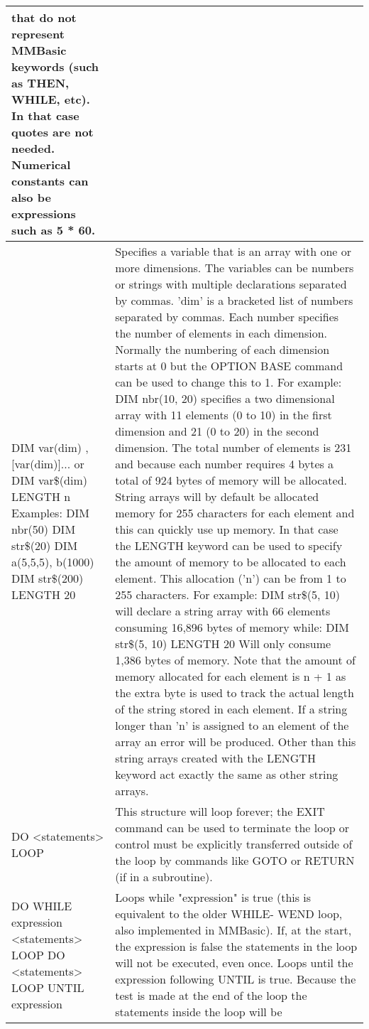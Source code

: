 \documentclass[11pt,fleqn]{book} %
\numberwithin{equation}{section} %
\numberwithin{figure}{section} %
\numberwithin{table}{section} %
\begin{document}
\begin{table}[]
\begin{tabular}{|p{4cm}|p{10cm}|}
that do not represent MMBasic keywords (such as THEN, WHILE, etc).
In that case quotes are not needed.
Numerical constants can also be expressions such as 5 * 60.
\\ \hline
DIM var(dim) , [var(dim)]...
or
DIM var\$(dim) LENGTH n
Examples:
DIM nbr(50)
DIM str\$(20)
DIM a(5,5,5), b(1000)
DIM str\$(200) LENGTH 20
&
Specifies a variable that is an array with one or more dimensions. The
variables can be numbers or strings with multiple declarations separated
by commas.
'dim' is a bracketed list of numbers separated by commas. Each number
specifies the number of elements in each dimension. Normally the
numbering of each dimension starts at 0 but the OPTION BASE
command can be used to change this to 1.
For example: DIM nbr(10, 20) specifies a two dimensional array with
11 elements (0 to 10) in the first dimension and 21 (0 to 20) in the
second dimension. The total number of elements is 231 and because
each number requires 4 bytes a total of 924 bytes of memory will be
allocated.
String arrays will by default be allocated memory for 255 characters for
each element and this can quickly use up memory. In that case the
LENGTH keyword can be used to specify the amount of memory to be
allocated to each element. This allocation ('n') can be from 1 to 255
characters.
For example: DIM str\$(5, 10) will declare a string array with 66
elements consuming 16,896 bytes of memory while:
DIM str\$(5, 10) LENGTH 20
Will only consume 1,386 bytes of memory. Note that the amount of
memory allocated for each element is n + 1 as the extra byte is used to
track the actual length of the string stored in each element.
If a string longer than 'n' is assigned to an element of the array an error
will be produced. Other than this string arrays created with the
LENGTH keyword act exactly the same as other string arrays.
\\ \hline
DO
<statements>
LOOP
& This structure will loop forever; the EXIT command can be used to
terminate the loop or control must be explicitly transferred outside of the
loop by commands like GOTO or RETURN (if in a subroutine).
\\ \hline
DO WHILE expression
<statements>
LOOP
DO
<statements>
LOOP UNTIL expression
& 
Loops while "expression" is true (this is equivalent to the older WHILE-
WEND loop, also implemented in MMBasic). If, at the start, the
expression is false the statements in the loop will not be executed, even
once.
Loops until the expression following UNTIL is true. Because the test is
made at the end of the loop the statements inside the loop will be

\end{tabular}
\end{table}
\end{document}
